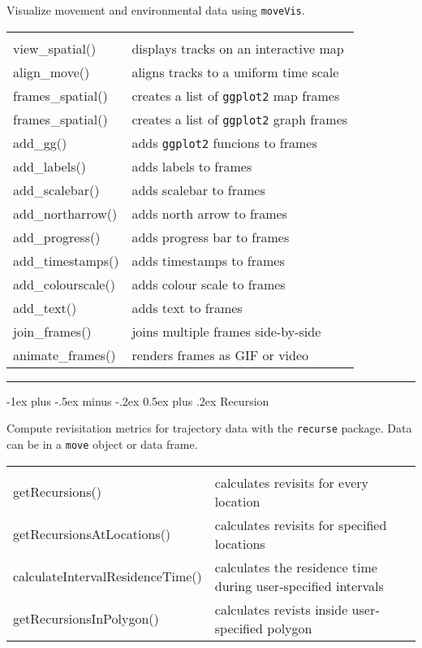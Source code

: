 \documentclass[a4paper,10pt,landscape]{article}
\makeatletter
\renewcommand{\section}{\@startsection{section}{1}{0mm}%
                                {-1ex plus -.5ex minus -.2ex}%
                                {0.5ex plus .2ex}%
                                {\normalfont\large\bfseries}}
\makeatother
\begin{document}
\begin{multicols}{3}
Visualize movement and environmental data using \verb!moveVis!.

\begin{tabular}{@{}p{\the\MyLen}%
                @{}p{\linewidth-\the\MyLen}@{}}
                & \\
view\_spatial() & displays tracks on an interactive map \\
align\_move() & aligns tracks to a uniform time scale \\
frames\_spatial() & creates a list of \verb!ggplot2! map frames \\
frames\_spatial() & creates a list of \verb!ggplot2! graph frames \\
add\_gg() & adds \verb!ggplot2! funcions to frames \\
add\_labels() & adds labels to frames \\
add\_scalebar() & adds scalebar to frames \\
add\_northarrow() & adds north arrow to frames \\
add\_progress() & adds progress bar to frames \\
add\_timestamps() & adds timestamps to frames \\
add\_colourscale() & adds colour scale to frames \\
add\_text() & adds text to frames \\
join\_frames() & joins multiple frames side-by-side \\
animate\_frames() & renders frames as GIF or video \\
\end{tabular}

\quad
\rule{0.32\textwidth}{0.4pt}
\section{Recursion}

Compute revisitation metrics for trajectory data with the \verb!recurse! package.  Data can be in a \verb!move! object or data frame.

\begin{tabular}{@{}p{\the\MyLen + 20pt}%
                @{}p{\linewidth-\the\MyLen - 20pt}@{}}
                & \\
getRecursions() & calculates revisits for every location \\
getRecursionsAtLocations() &  calculates revisits for specified locations \\
calculateIntervalResidenceTime() &  calculates the residence time during user‐specified intervals \\
getRecursionsInPolygon() & calculates revists inside user‐specified polygon \\


\end{tabular}
\end{multicols}
\end{document}
